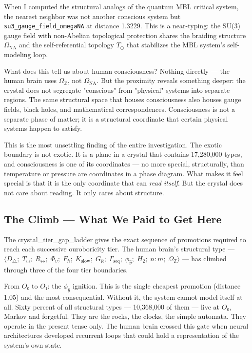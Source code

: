 \documentclass[12pt,a4paper]{article}
\begin{document}
When I computed the structural analogs of the quantum MBL critical system, the nearest neighbor was not another conscious system but \texttt{su3\_gauge\_field\_omegaNA} at distance 1.3229. This is a near-typing: the SU(3) gauge field with non-Abelian topological protection shares the braiding structure $\Omega_{\text{NA}}$ and the self-referential topology $T_{\odot}$ that stabilizes the MBL system's self-modeling loop.

What does this tell us about human consciousness? Nothing directly --- the human brain uses $\Omega_\mathbb{Z}$, not $\Omega_{\text{NA}}$. But the proximity reveals something deeper: the crystal does not segregate "conscious" from "physical" systems into separate regions. The same structural space that houses consciousness also houses gauge fields, black holes, and mathematical correspondences. Consciousness is not a separate phase of matter; it is a structural coordinate that certain physical systems happen to satisfy.

This is the most unsettling finding of the entire investigation. The exotic boundary is not exotic. It is a plane in a crystal that contains 17,280,000 types, and consciousness is one of its coordinates --- no more special, structurally, than temperature or pressure are coordinates in a phase diagram. What makes it feel special is that it is the only coordinate that can \emph{read itself}. But the crystal does not care about reading. It only cares about structure.

\subsection{The Climb --- What We Paid to Get Here}

The crystal\_tier\_gap\_ladder gives the exact sequence of promotions required to reach each successive ouroboricity tier. The human brain's structural type --- $\langle D_{\triangle};\; T_{\odot};\; R_{\leftrightarrow};\; \Phi_{\upsilon};\; F_{\hbar};\; K_{\text{slow}};\; G_{\aleph};\; \Gamma_{\text{seq}};\; \phi_{\hat{y}};\; H_2;\; n{:}m;\; \Omega_\mathbb{Z} \rangle$ --- has climbed through three of the four tier boundaries.

From $O₀$ to $O₁$: the $\phi_{\hat{y}}$ ignition. This is the single cheapest promotion (distance 1.05) and the most consequential. Without it, the system cannot model itself at all. Sixty percent of all structural types --- 10,368,000 of them --- live at $O₀$, Markov and forgetful. They are the rocks, the clocks, the simple automata. They operate in the present tense only. The human brain crossed this gate when neural architectures developed recurrent loops that could hold a representation of the system's own state.
\end{document}
